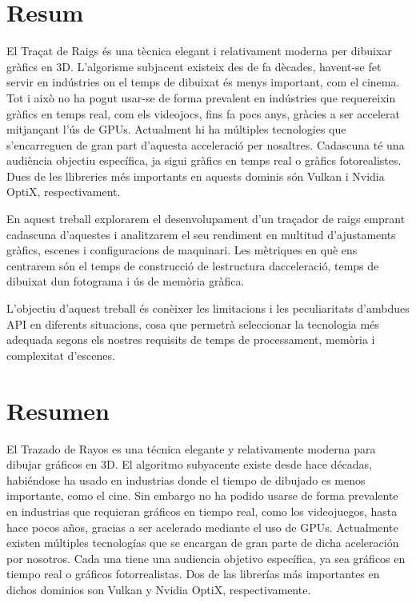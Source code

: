 

\chapter*{Resum}

El Traçat de Raigs és una tècnica elegant i relativament moderna per dibuixar gràfics en 3D. L'algorisme subjacent existeix des de fa dècades, havent-se fet servir en indústries on el temps de dibuixat és menys important, com el cinema. Tot i això no ha pogut usar-se de forma prevalent en indústries que requereixin gràfics en temps real, com els videojocs, fins fa pocs anys, gràcies a ser accelerat mitjançant l'ús de GPUs. Actualment hi ha múltiples tecnologies que s'encarreguen de gran part d'aquesta acceleració per nosaltres. Cadascuna té una audiència objectiu específica, ja sigui gràfics en temps real o gràfics fotorealistes. Dues de les llibreries més importants en aquests dominis són Vulkan i Nvidia OptiX, respectivament.

En aquest treball explorarem el desenvolupament d'un traçador de raigs emprant cadascuna d'aquestes i analitzarem el seu rendiment en multitud d'ajustaments gràfics, escenes i configuracions de maquinari. Les mètriques en què ens centrarem són el temps de construcció de lestructura dacceleració, temps de dibuixat dun fotograma i ús de memòria gràfica.

L'objectiu d'aquest treball és conèixer les limitacions i les peculiaritats d'ambdues API en diferents situacions, cosa que permetrà seleccionar la tecnologia més adequada segons els nostres requisits de temps de processament, memòria i complexitat d'escenes.

\newpage

\chapter*{Resumen}

El Trazado de Rayos es una técnica elegante y relativamente moderna para dibujar gráficos en 3D. El algoritmo subyacente existe desde hace décadas, habiéndose ha usado en industrias donde el tiempo de dibujado es menos importante, como el cine. Sin embargo no ha podido usarse de forma prevalente en industrias que requieran gráficos en tiempo real, como los videojuegos, hasta hace pocos años, gracias a ser acelerado mediante el uso de GPUs. Actualmente existen múltiples tecnologías que se encargan de gran parte de dicha aceleración por nosotros. Cada una tiene una audiencia objetivo específica, ya sea gráficos en tiempo real o gráficos fotorrealistas. Dos de las librerías más importantes en dichos dominios son Vulkan y Nvidia OptiX, respectivamente.

